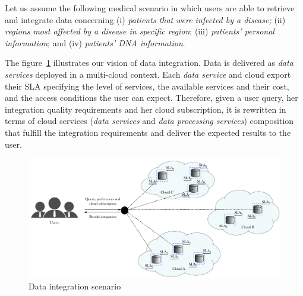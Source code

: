 Let us assume the following medical scenario in which users are able to retrieve and integrate data concerning (i) \textit{patients that were infected by a disease;}
(ii) \textit{regions most affected by a disease in specific region}; (iii)
\textit{patients' personal information}; and (iv) \textit{patients' DNA
information}.

The figure~\ref{fig:scenario} illustrates our vision of data integration. Data is delivered as \textit{data services} deployed in a multi-cloud context. Each \textit{data service} and cloud export their SLA specifying the level of services, the available services and their cost, and the access conditions the user can expect. Therefore, given a user query, her integration quality requirements and her cloud subscription, it is rewritten in terms of cloud services (\textit{data services} and \textit{data processing services}) composition that fulfill the integration requirements and deliver the expected results to the user.

\begin{figure}[h!]
\center
\includegraphics[scale=0.57]{scenario.pdf}
\caption{Data integration scenario}\label{fig:scenario}
\end{figure}

